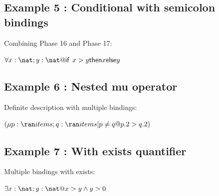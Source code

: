 \documentclass[a4paper,10pt,fleqn]{article}
\begin{document}
\subsection*{Example 5 : Conditional with semicolon bindings}

\noindent Combining Phase 16 and Phase 17:

\bigskip

\noindent $\forall x : \nat; y : \nat @ \IF x > y \THEN x \ELSE y$

\bigskip

\subsection*{Example 6 : Nested mu operator}

\noindent Definite description with multiple bindings:

\bigskip

\noindent $(\mu p : \ran items; q : \ran items | p \neq q @ p.2 > q.2)$

\bigskip

\subsection*{Example 7 : With exists quantifier}

\noindent Multiple bindings with exists:

\bigskip

\noindent $\exists x : \nat; y : \nat @ x > y \land y > 0$

\bigskip
\end{document}
